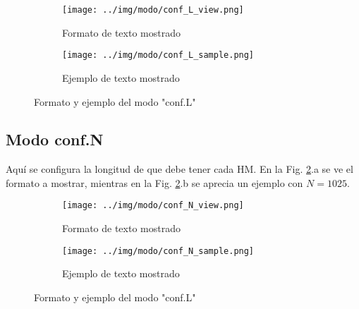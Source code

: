\documentclass[main_conf.tex]{subfiles}
\begin{document}
\begin{figure}[!t]
  \centering
  \begin{subfigure}[b]{0.5\textwidth}
    \centering
    \texttt{[image: ../img/modo/conf\_L\_view.png]}
    \caption{Formato de texto mostrado}
  \end{subfigure}

  \begin{subfigure}[b]{0.5\textwidth}
    \centering
    \texttt{[image: ../img/modo/conf\_L\_sample.png]}
    \caption{Ejemplo de texto mostrado}
  \end{subfigure}

  \caption{Formato y ejemplo del modo "conf.L"}
  \label{Modo_Conf_L}
\end{figure}

\subsection{Modo conf.N}
Aquí se configura la longitud de que debe tener cada HM.
En la Fig. \ref{Modo_Conf_N}.a se ve el formato a mostrar,
mientras en la Fig. \ref{Modo_Conf_N}.b se aprecia un
ejemplo con $N = 1025$.

\begin{figure}[!t]
  \centering
  \begin{subfigure}[b]{0.5\textwidth}
    \centering
    \texttt{[image: ../img/modo/conf\_N\_view.png]}
    \caption{Formato de texto mostrado}
  \end{subfigure}

  \begin{subfigure}[b]{0.5\textwidth}
    \centering
    \texttt{[image: ../img/modo/conf\_N\_sample.png]}
    \caption{Ejemplo de texto mostrado}
  \end{subfigure}

  \caption{Formato y ejemplo del modo "conf.L"}
  \label{Modo_Conf_N}
\end{figure}
\end{document}
